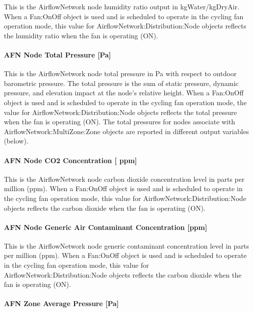 This is the AirflowNetwork node humidity ratio output in kgWater/kgDryAir. When a Fan:OnOff object is used and is scheduled to operate in the cycling fan operation mode, this value for AirflowNetwork:Distribution:Node objects reflects the humidity ratio when the fan is operating (ON).

\paragraph{AFN Node Total Pressure {[}Pa{]}}\label{afn-node-total-pressure-pa}

This is the AirflowNetwork node total pressure in Pa with respect to outdoor barometric pressure. The total pressure is the sum of static pressure, dynamic pressure, and elevation impact at the node's relative height. When a Fan:OnOff object is used and is scheduled to operate in the cycling fan operation mode, the value for AirflowNetwork:Distribution:Node objects reflects the total pressure when the fan is operating (ON). The total pressures for nodes associate with AirflowNetwork:MultiZone:Zone objects are reported in different output variables (below).

\paragraph{AFN Node CO2 Concentration {[} ppm{]}}\label{afn-node-co2-concentration-ppm}

This is the AirflowNetwork node carbon dioxide concentration level in parts per million (ppm). When a Fan:OnOff object is used and is scheduled to operate in the cycling fan operation mode, this value for AirflowNetwork:Distribution:Node objects reflects the carbon dioxide when the fan is operating (ON).

\paragraph{AFN Node Generic Air Contaminant Concentration {[}ppm{]}}\label{afn-node-generic-air-contaminant-concentration-ppm}

This is the AirflowNetwork node generic contaminant concentration level in parts per million (ppm). When a Fan:OnOff object is used and is scheduled to operate in the cycling fan operation mode, this value for AirflowNetwork:Distribution:Node objects reflects the carbon dioxide when the fan is operating (ON).

\paragraph{AFN Zone Average Pressure {[}Pa{]}}\label{afn-zone-average-pressure-pa}

